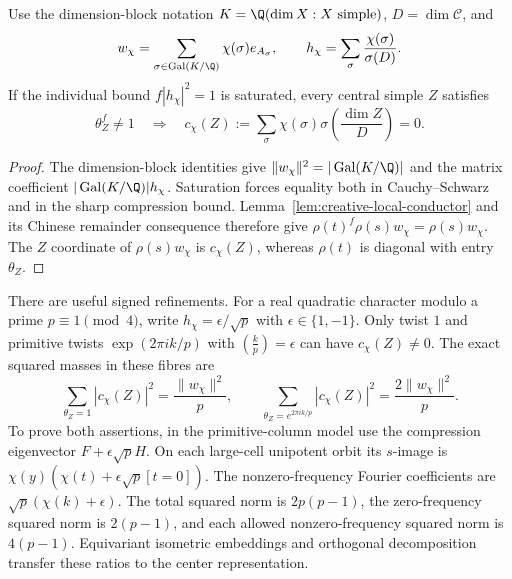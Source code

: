 \begin{theorem}
\label{thm:creative-conductor-support}
Use the dimension-block notation
$K=\Q(\dim X:X\text{ simple})$, $D=\dim\mathcal C$, and
\[
 w_\chi=\sum_{\sigma\in\operatorname{Gal}(K/\Q)}
          \chi(\sigma)e_{A_\sigma},\qquad
 h_\chi=\sum_\sigma\frac{\chi(\sigma)}{\sigma(D)}.
\]
If the individual bound $f|h_\chi|^2=1$ is saturated, every central
simple $Z$ satisfies
\[
 \theta_Z^f\ne1\quad\Longrightarrow\quad
 c_\chi(Z):=\sum_\sigma\chi(\sigma)
                \sigma\!\left(\frac{\dim Z}{D}\right)=0.
\]
\end{theorem}
\begin{proof}
The dimension-block identities
\cite[Lemma~3.1]{SchopierayDimensionBlock} give
$\|w_\chi\|^2=|\operatorname{Gal}(K/\Q)|$ and the matrix
coefficient $|\operatorname{Gal}(K/\Q)|h_\chi$.
Saturation forces equality both in Cauchy--Schwarz and in the sharp
compression bound. Lemma~\ref{lem:creative-local-conductor} and its
Chinese remainder consequence therefore give
$\rho(t)^f\rho(s)w_\chi=\rho(s)w_\chi$.
The $Z$ coordinate of $\rho(s)w_\chi$ is $c_\chi(Z)$, whereas
$\rho(t)$ is diagonal with entry $\theta_Z$.
\end{proof}

There are useful signed refinements. For a real quadratic character
modulo a prime $p\equiv1\pmod4$, write
$h_\chi=\epsilon/\sqrt p$ with $\epsilon\in\{1,-1\}$.
Only twist $1$ and primitive twists $\exp(2\pi ik/p)$ with
$\left(\frac{k}{p}\right)=\epsilon$ can have $c_\chi(Z)\ne0$.
The exact squared masses in these fibres are
\begin{equation}\label{eq:creative-prime-masses}
 \sum_{\theta_Z=1}|c_\chi(Z)|^2=\frac{\|w_\chi\|^2}{p},
 \qquad
 \sum_{\theta_Z=e^{2\pi ik/p}}|c_\chi(Z)|^2
       =\frac{2\|w_\chi\|^2}{p}.
\end{equation}
To prove both assertions, in the primitive-column model use the
compression eigenvector $F+\epsilon\sqrt pH$.
On each large-cell unipotent orbit its $s$-image is
$\chi(y)(\chi(t)+\epsilon\sqrt p[t=0])$.
The nonzero-frequency Fourier coefficients are
$\sqrt p(\chi(k)+\epsilon)$. The total squared norm is
$2p(p-1)$, the zero-frequency squared norm is $2(p-1)$, and
each allowed nonzero-frequency squared norm is $4(p-1)$.
Equivariant isometric embeddings and orthogonal decomposition transfer
these ratios to the center representation.

